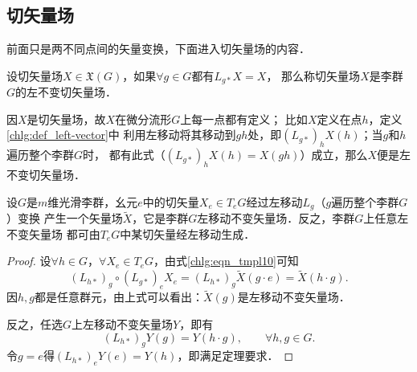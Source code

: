 \subsection{切矢量场}
前面只是两不同点间的矢量变换，下面进入切矢量场的内容．
\begin{definition}\label{chlg:def_left-vector}
    设切矢量场$X\in \mathfrak{X}(G)$，如果$\forall g\in G$都有$L_{g*}X=X$，
    那么称切矢量场$X$是李群$G$的{\heiti 左不变切矢量场}．
\end{definition}
因$X$是切矢量场，故$X$在微分流形$G$上每一点都有定义；
比如$X$定义在点$h$，定义\ref{chlg:def_left-vector}中
利用左移动将其移动到$gh$处，即$(L_{g*})_h X(h)$；当$g$和$h$遍历整个李群$G$时，
都有此式（$(L_{g*})_h X(h)=X(gh)$）成立，那么$X$便是左不变切矢量场．



\begin{theorem}\label{chlg:thm_lfv}
设$G$是$m$维光滑李群，幺元$e$中的切矢量$X_e\in T_eG$经过左移动$L_g$（$g$遍历整个李群$G$）变换
产生一个矢量场$\widetilde{X}$，它是李群$G$左移动不变矢量场．反之，李群$G$上任意左不变矢量场
都可由$T_eG$中某切矢量经左移动生成．
\end{theorem}
\begin{proof}
    设$\forall h\in G$，$\forall X_e\in T_eG$，由式\eqref{chlg:eqn_tmpl10}可知
    \begin{equation}
       (L_{h*})_g  \circ (L_{g*})_e  X_e = 
        (L_{h*})_g \widetilde{X}(g\cdot e) =\widetilde{X}(h \cdot g) .
    \end{equation}
    因$h,g$都是任意群元，由上式可以看出：$\widetilde{X}(g)$是左移动不变矢量场．
    
    反之，任选$G$上左移动不变矢量场${Y}$，即有
    \begin{equation}
       (L_{h*})_g {Y}(g) ={Y}(h \cdot g),\qquad \forall h,g\in G .
    \end{equation}
    令$g=e$得$(L_{h*})_e {Y}(e) ={Y}(h)$，即满足定理要求．
\end{proof}

